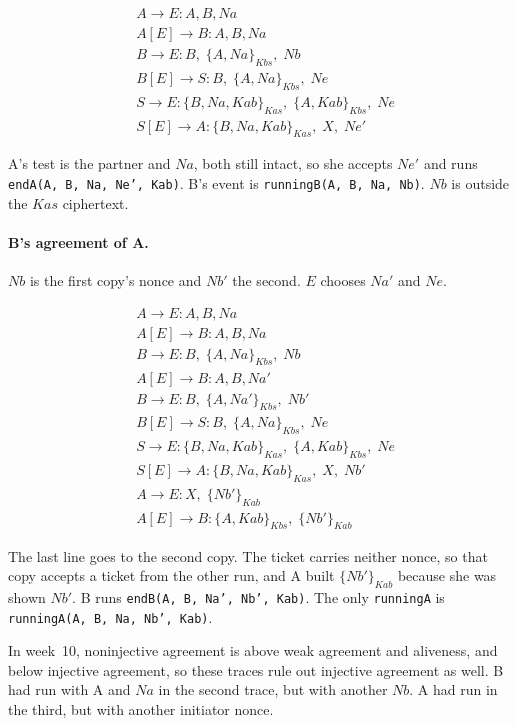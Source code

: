 \documentclass[11pt]{article}
\newcommand{\enc}[2]{\{#1\}_{#2}}
\begin{document}
\begin{align*}
&A \rightarrow E : A, B, Na \\
&A[E] \rightarrow B : A, B, Na \\
&B \rightarrow E : B,\; \enc{A, Na}{Kbs},\; Nb \\
&B[E] \rightarrow S : B,\; \enc{A, Na}{Kbs},\; Ne \\
&S \rightarrow E : \enc{B, Na, Kab}{Kas},\; \enc{A, Kab}{Kbs},\; Ne \\
&S[E] \rightarrow A : \enc{B, Na, Kab}{Kas},\; X,\; Ne'
\end{align*}

A's test is the partner and $Na$, both still intact, so she accepts $Ne'$ and runs \texttt{endA(A, B, Na, Ne', Kab)}. B's event is \texttt{runningB(A, B, Na, Nb)}. $Nb$ is outside the $Kas$ ciphertext.

\paragraph{B's agreement of A.}
$Nb$ is the first copy's nonce and $Nb'$ the second. $E$ chooses $Na'$ and $Ne$.

\begin{align*}
&A \rightarrow E : A, B, Na \\
&A[E] \rightarrow B : A, B, Na \\
&B \rightarrow E : B,\; \enc{A, Na}{Kbs},\; Nb \\
&A[E] \rightarrow B : A, B, Na' \\
&B \rightarrow E : B,\; \enc{A, Na'}{Kbs},\; Nb' \\
&B[E] \rightarrow S : B,\; \enc{A, Na}{Kbs},\; Ne \\
&S \rightarrow E : \enc{B, Na, Kab}{Kas},\; \enc{A, Kab}{Kbs},\; Ne \\
&S[E] \rightarrow A : \enc{B, Na, Kab}{Kas},\; X,\; Nb' \\
&A \rightarrow E : X,\; \enc{Nb'}{Kab} \\
&A[E] \rightarrow B : \enc{A, Kab}{Kbs},\; \enc{Nb'}{Kab}
\end{align*}

The last line goes to the second copy. The ticket carries neither nonce, so that copy accepts a ticket from the other run, and A built $\enc{Nb'}{Kab}$ because she was shown $Nb'$. B runs \texttt{endB(A, B, Na', Nb', Kab)}. The only \texttt{runningA} is \texttt{runningA(A, B, Na, Nb', Kab)}.

In week~10, noninjective agreement is above weak agreement and aliveness, and below injective agreement, so these traces rule out injective agreement as well. B had run with A and $Na$ in the second trace, but with another $Nb$. A had run in the third, but with another initiator nonce.
\end{document}
